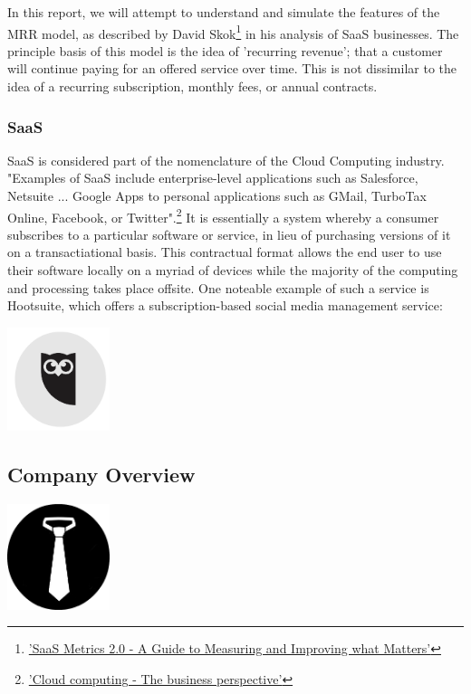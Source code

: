 \documentclass[11pt]{article}
\begin{document}
In this report, we will attempt to understand and simulate the features of the MRR model, as described by David Skok\footnote{\href{http://www.forentrepreneurs.com/saas-metrics-2/}{'SaaS Metrics 2.0 - A Guide to Measuring and Improving what Matters'}} in his analysis of SaaS businesses. The principle basis of this model is the idea of 'recurring revenue'; that a customer will continue paying for an offered service over time. This is not dissimilar to the idea of a recurring subscription, monthly fees, or annual contracts. 


\subsubsection*{SaaS}

SaaS is considered part of the nomenclature of the Cloud Computing industry. "Examples of SaaS include enterprise-level applications such as Salesforce, Netsuite ... Google Apps to personal applications such as
GMail, TurboTax Online, Facebook, or Twitter".\footnote{\href{http://www.sciencedirect.com/science/article/pii/S0167923610002393}{'Cloud computing - The business perspective'}} It is essentially a system whereby a consumer subscribes to a particular software or service, in lieu of purchasing versions of it on a transactiational basis. This contractual format allows the end user to use their software locally on a myriad of devices while the majority of the computing and processing takes place offsite. One noteable example of such a service is Hootsuite, which offers a subscription-based social media management service:
\begin{center}
\href{http://www.hootsuite.com}{\includegraphics[width=3cm]{HootSuite.png}}
\end{center}


\newpage

\subsection*{Company Overview}

\begin{center}
\includegraphics[width=3cm]{Tie.png}
\end{center}
\end{document}
